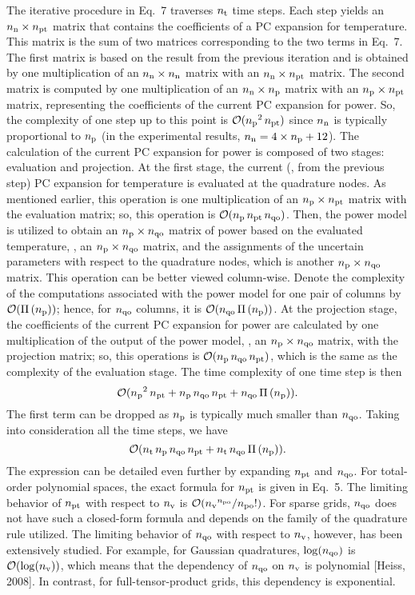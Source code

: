 \begin{authors}
The iterative procedure in Eq.~7 traverses ${n_\text{t}}$ time steps.
Each step yields an ${n_\text{n}} \times {n_\text{pt}}$ matrix that contains the coefficients of a PC expansion for temperature.
This matrix is the sum of two matrices corresponding to the two terms in Eq.~7.
The first matrix is based on the result from the previous iteration and is obtained by one multiplication of an ${n_\text{n}} \times {n_\text{n}}$ matrix with an ${n_\text{n}} \times {n_\text{pt}}$ matrix.
The second matrix is computed by one multiplication of an ${n_\text{n}} \times {n_\text{p}}$ matrix with an ${n_\text{p}} \times {n_\text{pt}}$ matrix, representing the coefficients of the current PC expansion for power.
So, the complexity of one step up to this point is $\mathcal{O}({n_\text{p}}^2 \, {n_\text{pt}})$ since ${n_\text{n}}$ is typically proportional to ${n_\text{p}}$ (in the experimental results, ${n_\text{n}} = 4 \times {n_\text{p}} + 12$).
The calculation of the current PC expansion for power is composed of two stages: evaluation and projection.
At the first stage, the current (\ie, from the previous step) PC expansion for temperature is evaluated at the quadrature nodes.
As mentioned earlier, this operation is one multiplication of an ${n_\text{p}} \times {n_\text{pt}}$ matrix with the evaluation matrix; so, this operation is $\mathcal{O}({n_\text{p}} \, {n_\text{pt}} \, {n_\text{qo}})$.
Then, the power model is utilized to obtain an ${n_\text{p}} \times {n_\text{qo}}$ matrix of power based on the evaluated temperature, \ie, an ${n_\text{p}} \times {n_\text{qo}}$ matrix, and the assignments of the uncertain parameters with respect to the quadrature nodes, which is another ${n_\text{p}} \times {n_\text{qo}}$ matrix.
This operation can be better viewed column-wise.
Denote the complexity of the computations associated with the power model for one pair of columns by $\O(\oPower{\nprocs})$; hence, for ${n_\text{qo}}$ columns, it is $\O(\qdorder \, \oPower{\nprocs})$.
At the projection stage, the coefficients of the current PC expansion for power are calculated by one multiplication of the output of the power model, \ie, an ${n_\text{p}} \times {n_\text{qo}}$ matrix, with the projection matrix; so, this operations is $\mathcal{O}({n_\text{p}} \, {n_\text{qo}} \, {n_\text{pt}})$, which is the same as the complexity of the evaluation stage.
The time complexity of one time step is then
\[
  \O(\nprocs^2 \, \pcterms + \nprocs \, \qdorder \, \pcterms + \qdorder \, \oPower{\nprocs}).
\]
The first term can be dropped as ${n_\text{p}}$ is typically much smaller than ${n_\text{qo}}$.
Taking into consideration all the time steps, we have
\[
  \O(\nsteps \, \nprocs \, \qdorder \, \pcterms + \nsteps \, \qdorder \, \oPower{\nprocs}).
\]
The expression can be detailed even further by expanding ${n_\text{pt}}$ and ${n_\text{qo}}$.
For total-order polynomial spaces, the exact formula for ${n_\text{pt}}$ is given in Eq.~5.
The limiting behavior of ${n_\text{pt}}$ with respect to ${n_\text{v}}$ is $\mathcal{O}({n_\text{v}}^{n_\text{po}} / {n_\text{po}}!)$.
For sparse grids, ${n_\text{qo}}$ does not have such a closed-form formula and depends on the family of the quadrature rule utilized.
The limiting behavior of ${n_\text{qo}}$ with respect to ${n_\text{v}}$, however, has been extensively studied.
For example, for Gaussian quadratures, $\log({n_\text{qo}})$ is $\mathcal{O}(\log({n_\text{v}}))$, which means that the dependency of ${n_\text{qo}}$ on ${n_\text{v}}$ is polynomial [Heiss, 2008].
In contrast, for full-tensor-product grids, this dependency is exponential.


\end{authors}
